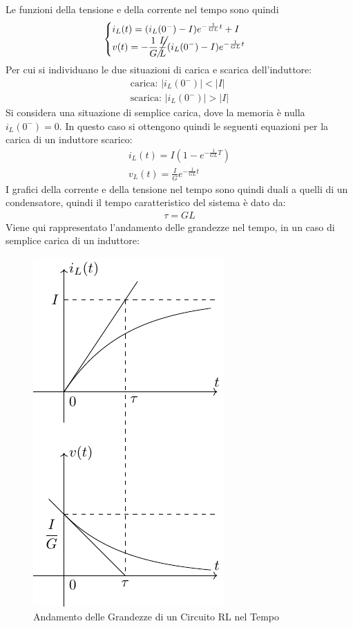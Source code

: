 \documentclass{article}
\numberwithin{equation}{subsection}
\begin{document}
Le funzioni della tensione e della corrente nel tempo sono quindi
\begin{gather}
    \begin{cases}
        i_L(t)=(i_L(0^-)-I)e^{-\frac{1}{GL}t}+I\\
        v(t)=\displaystyle-\frac{1}{G}\cancel{\frac{L}{L}}(i_L(0^-)-I)e^{-\frac{1}{GL}t}
    \end{cases}
\end{gather}
Per cui si individuano le due situazioni di carica e scarica dell'induttore:
\begin{gather*}
    \mbox{carica: }|i_L(0^-)|<|I|\\
    \mbox{scarica: }|i_L(0^-)|>|I|
\end{gather*}
Si considera una situazione di semplice carica, dove la memoria è nulla $i_L(0^-)=0$.
In questo caso si ottengono quindi le seguenti equazioni per la carica di un induttore scarico:
\begin{gather*}
    i_L(t)=I\left(1-e^{-\frac{1}{GL}T}\right)\\
    v_L(t)=\displaystyle\frac{I}{G}e^{-\frac{1}{GL}t}
\end{gather*}
I grafici della corrente e della tensione nel tempo sono quindi duali a quelli di un condensatore, quindi il tempo caratteristico del sistema è dato da:
\begin{gather}
    \tau=GL
\end{gather}
Viene qui rappresentato l'andamento delle grandezze nel tempo, in un caso di semplice carica di un induttore:
\begin{figure}[H]%
    \centering
    \includegraphics{andamento-circuito-rl.pdf}%
    \caption{Andamento delle Grandezze di un Circuito RL nel Tempo}
    \label{fig:andamento-circuito-rl}
\end{figure}
\end{document}
